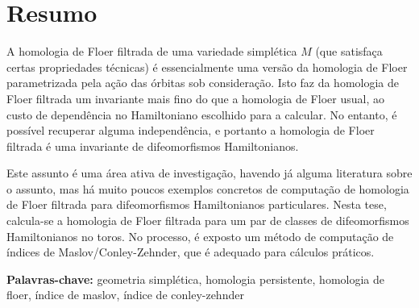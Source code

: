 
\section*{Resumo}


A homologia de Floer filtrada de uma variedade simplética $M$ (que satisfaça certas propriedades técnicas) é essencialmente uma versão da homologia de Floer parametrizada pela ação das órbitas sob consideração. Isto faz da homologia de Floer filtrada um invariante mais fino do que a homologia de Floer usual, ao custo de dependência no Hamiltoniano escolhido para a calcular. No entanto, é possível recuperar alguma independência, e portanto a homologia de Floer filtrada é uma invariante de difeomorfismos Hamiltonianos.

Este assunto é uma área ativa de investigação, havendo já alguma literatura sobre o assunto, mas há muito poucos exemplos concretos de computação de homologia de Floer filtrada para difeomorfismos Hamiltonianos particulares. Nesta tese, calcula-se a homologia de Floer filtrada para um par de classes de difeomorfismos Hamiltonianos no toros. No processo, é exposto um método de computação de índices de Maslov/Conley-Zehnder, que é adequado para cálculos práticos.

\vfill

\textbf{\Large Palavras-chave:} geometria simplética, homologia persistente, homologia de floer, índice de maslov, índice de conley-zehnder
